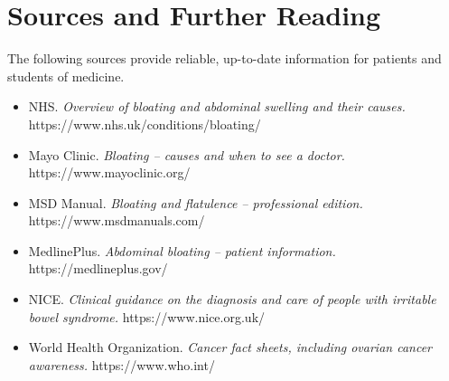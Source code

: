 \section*{Sources and Further Reading}
The following sources provide reliable, up-to-date information for patients and students of medicine.

\begin{itemize}
    \item NHS. \textit{Overview of bloating and abdominal swelling and their causes.} https://www.nhs.uk/conditions/bloating/
    \item Mayo Clinic. \textit{Bloating -- causes and when to see a doctor.} https://www.mayoclinic.org/
    \item MSD Manual. \textit{Bloating and flatulence -- professional edition.} https://www.msdmanuals.com/
    \item MedlinePlus. \textit{Abdominal bloating -- patient information.} https://medlineplus.gov/
    \item NICE. \textit{Clinical guidance on the diagnosis and care of people with irritable bowel syndrome.} https://www.nice.org.uk/
    \item World Health Organization. \textit{Cancer fact sheets, including ovarian cancer awareness.} https://www.who.int/
\end{itemize}
